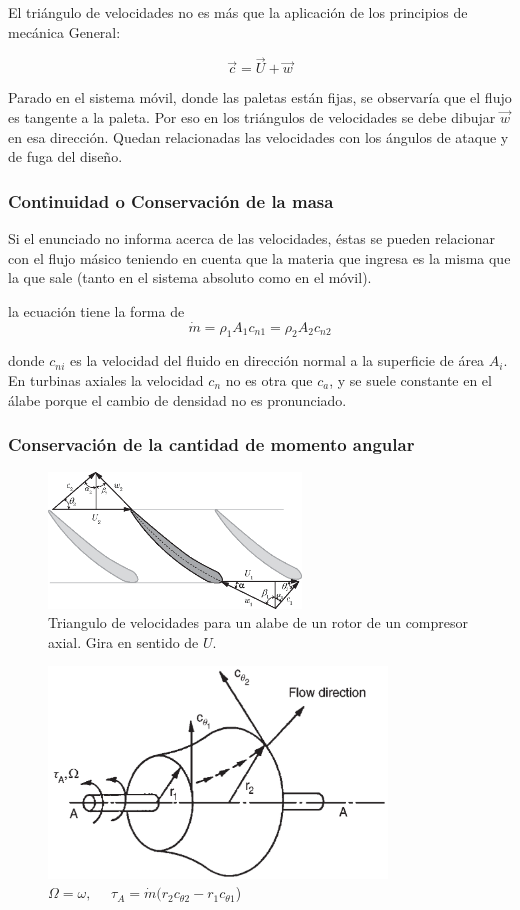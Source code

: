 \documentclass{article}
\newcommand{\ctan}[1]{\ensuremath{c_{\theta #1}}}
\newcommand{\angvel}{\ensuremath{\omega}}
\newcommand{\dm}{\dot{m}}
\begin{document}
El triángulo de velocidades no es más que la aplicación de los principios de mecánica General: 

\[\Vec{c}=\Vec{U}+\Vec{w}\]

Parado en el sistema móvil, donde las paletas están fijas, se observaría que el flujo es tangente a la paleta. Por eso en los triángulos de velocidades se debe dibujar $\Vec{w}$ en esa dirección. Quedan relacionadas las velocidades con los ángulos de ataque y de fuga del diseño.  

\subsubsection*{Continuidad o Conservación de la masa}
Si el enunciado no informa acerca de las velocidades, éstas se pueden relacionar con el flujo másico teniendo en cuenta que la materia que ingresa es la misma que la que sale (tanto en el sistema absoluto como en el móvil).

la ecuación tiene la forma de 
\[
\dm=\rho_1 A_1 c_{n1} = \rho_2 A_2 c_{n2}
\]

donde $c_{ni}$ es la velocidad del fluido en dirección normal a la superficie de área $A_i$. En turbinas axiales la velocidad $c_{n}$ no es otra que $c_{a}$, y se suele constante en el álabe porque el cambio de densidad no es pronunciado. 
\subsubsection{Conservación de la cantidad de momento angular}
\begin{figure}[htb!]
    \centering
    \includegraphics[width=0.6\textwidth]{fig/VelTrianglegeneral.eps}
    \caption{Triangulo de velocidades para un alabe de un rotor de un compresor axial. Gira en sentido de $U$.}
    \label{fig:veltrianggeneral}
\end{figure}


\begin{figure}
    \centering
    \includegraphics[width=9cm]{fig/turb.png}
    \caption{$\Omega=\angvel,\quad$      $\tau_A=\dot{m}(r_2 \ctan{2} -r_1 \ctan{1}$)}
    \label{fig:turbina}
\end{figure}
\end{document}
